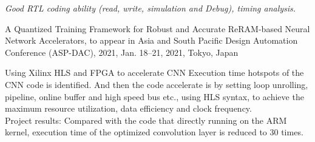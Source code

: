 \documentclass[10pt,a4paper]{article} %
\begin{document}

\begin{center}
    \textit{Good RTL coding ability (read, write, simulation and Debug), timing analysis.}
\end{center}


\spacedhrule{0.5em}{-0.4em} %



\inlineheadsection %
{}{A Quantized Training Framework for Robust and Accurate ReRAM-based Neural Network Accelerators, to appear in Asia and South Pacific Design Automation Conference (ASP-DAC), 2021, Jan. 18–21, 2021, Tokyo, Japan}


\spacedhrule{1.5em}{-0.4em} %



\inlineheadsection %
{Using Xilinx HLS and FPGA to accelerate CNN}
{Execution time hotspots of the CNN code is identified.
    And then the code accelerate is by setting loop unrolling, pipeline, online buffer and high speed bus etc., using HLS syntax, 
    to achieve the maximum resource utilization, data efficiency and clock frequency.\\
    Project results: Compared with the code that directly running on the ARM kernel, 
    execution time of the optimized convolution layer is reduced to 30 times.
}
\end{document}
